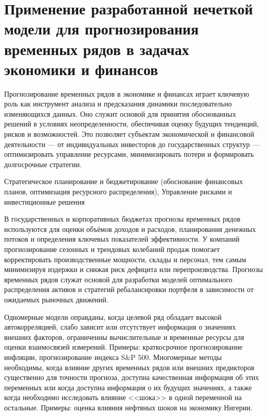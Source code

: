 \chapter{Применение разработанной нечеткой модели для прогнозирования временных рядов в задачах экономики и финансов}

Прогнозирование временных рядов в экономике и финансах играет ключевую роль как инструмент анализа и предсказания динамики последовательно изменяющихся данных. Оно служит основой для принятия обоснованных решений в условиях неопределенности, обеспечивая оценку будущих тенденций, рисков и возможностей. Это позволяет субъектам экономической и финансовой деятельности — от индивидуальных инвесторов до государственных структур — оптимизировать управление ресурсами, минимизировать потери и формировать долгосрочные стратегии.

Стратегическое планирование и бюджетирование (обоснование финансовых планов, оптимизация ресурсного распределения), Управление рисками и инвестиционные решения

В государственных и корпоративных бюджетах прогнозы временных рядов используются для оценки объёмов доходов и расходов, планирования денежных потоков и определения ключевых показателей эффективности. У компаний прогнозирование сезонных и трендовых колебаний продаж помогает корректировать производственные мощности, склады и персонал, тем самым минимизируя издержки и снижая риск дефицита или перепроизводства. Прогнозы временных рядов служат основой для разработки моделей оптимального распределения активов и стратегий ребалансировки портфеля в зависимости от ожидаемых рыночных движений.

Одномерные модели оправданы, когда целевой ряд обладает высокой автокорреляцией, слабо зависит или отсутствует информация о значениях внешних факторов, ограниченны вычислительные и временные ресурсы для оценки взаимосвязей измерений. Примеры: краткосрочное прогнозирование инфляции, прогнозирование индекса S\&P 500. Многомерные методы необходимы, когда влияние других временных рядов или внешних предикторов существенно для точности прогноза, доступна качественная информация об этих переменных или когда доступна информация о их будущих значениях, а также когда необходимо исследовать влияние <<шока>> в одной переменной на остальные. Примеры: оценка влияния нефтяных шоков на экономику Нигерии.



